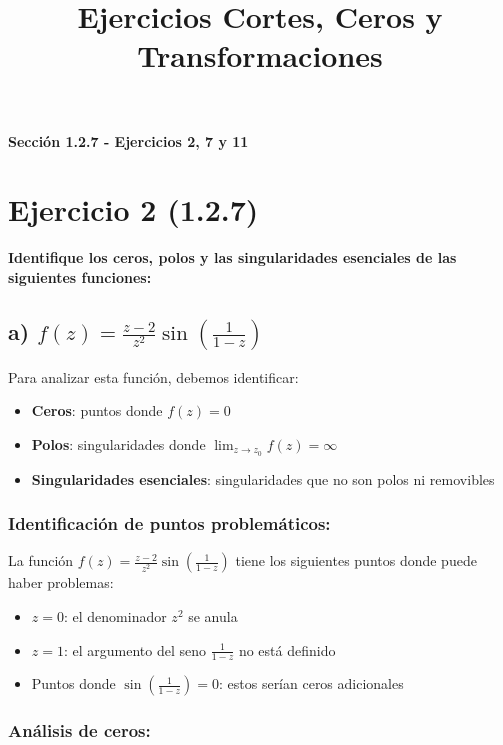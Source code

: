 \documentclass{article}
\title{Ejercicios Cortes, Ceros y Transformaciones}
\author{}
\date{}
\begin{document}
\maketitle

\begin{center}
\textbf{Sección 1.2.7 - Ejercicios 2, 7 y 11}
\end{center}

\vspace{0.5cm}

\section*{Ejercicio 2 (1.2.7)}

\textbf{Identifique los ceros, polos y las singularidades esenciales de las siguientes funciones:}

\subsection*{a) $f(z) = \frac{z - 2}{z^2} \sin\left(\frac{1}{1 - z}\right)$}

Para analizar esta función, debemos identificar:
\begin{itemize}
\item \textbf{Ceros}: puntos donde $f(z) = 0$
\item \textbf{Polos}: singularidades donde $\lim_{z \to z_0} f(z) = \infty$
\item \textbf{Singularidades esenciales}: singularidades que no son polos ni removibles
\end{itemize}

\subsubsection*{Identificación de puntos problemáticos:}

La función $f(z) = \frac{z - 2}{z^2} \sin\left(\frac{1}{1 - z}\right)$ tiene los siguientes puntos donde puede haber problemas:
\begin{itemize}
\item $z = 0$: el denominador $z^2$ se anula
\item $z = 1$: el argumento del seno $\frac{1}{1 - z}$ no está definido
\item Puntos donde $\sin\left(\frac{1}{1 - z}\right) = 0$: estos serían ceros adicionales
\end{itemize}

\subsubsection*{Análisis de ceros:}
\end{document}
